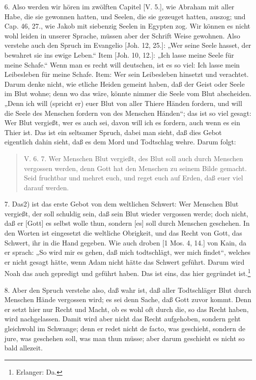 6. Also werden wir hören im zwölften Capitel [V. 5.], wie Abraham mit aller Habe, die sie gewonnen hatten, und Seelen, die sie gezeuget hatten, auszog; und Cap. 46, 27., wie Jakob mit siebenzig Seelen in Egypten zog. Wir können es nicht wohl leiden in unserer Sprache, müssen aber der Schrift Weise gewohnen. Also verstehe auch den Spruch im Evangelio [Joh. 12, 25.]: „Wer seine Seele hasset, der bewahret sie ins ewige Leben.“ Item [Joh. 10, 12.]: „Ich lasse meine Seele für meine Schafe.“ Wenn man es recht will deutschen, ist es so viel: Ich lasse mein Leibesleben für meine Schafe. Item: Wer sein Leibesleben hinsetzt und verachtet. Darum denke nicht, wie etliche Heiden gemeint haben, daß der Geist oder Seele im Blut wohne; denn wo das wäre, könnte nimmer die Seele vom Blut abscheiden. „Denn ich will (spricht er) euer Blut von aller Thiere Händen fordern, und will die Seele des Menschen fordern von des Menschen Händen“; das ist so viel gesagt: Wer Blut vergießt, wer es auch sei, davon will ich es fordern, auch wenn es ein Thier ist. Das ist ein seltsamer Spruch, dabei man sieht, daß dies Gebot eigentlich dahin sieht, daß es dem Mord und Todtschlag wehre. Darum folgt:

\begin{quote}
V. 6. 7. Wer Menschen Blut vergießt, des Blut soll auch durch Menschen vergossen werden, denn Gott hat den Menschen zu seinem Bilde gemacht. Seid fruchtbar und mehret euch, und reget euch auf Erden, daß euer viel darauf werden.
\end{quote}

7. Das2) ist das erste Gebot von dem weltlichen Schwert: Wer Menschen Blut vergießt, der soll schuldig sein, daß sein Blut wieder vergossen werde; doch nicht, daß er [Gott] es selbst wolle thun, sondern [es] soll durch Menschen geschehen. In den Worten ist eingesetzt die weltliche Obrigkeit, und das Recht von Gott, das Schwert, ihr in die Hand gegeben. Wie auch droben [1 Mos. 4, 14.] von Kain, da er sprach: „So wird mir es gehen, daß mich todtschlägt, wer mich findet“, welches er nicht gesagt hätte, wenn Adam nicht hätte das Schwert geführt. Darum wird Noah das auch gepredigt und geführt haben. Das ist eins, das hier gegründet ist.\footnote{Erlanger: Da.}

8. Aber den Spruch verstehe also, daß wahr ist, daß aller Todtschläger Blut durch Menschen Hände vergossen wird; es sei denn Sache, daß Gott zuvor kommt. Denn er setzt hier nur Recht und Macht, ob es wohl oft durch die, so das Recht haben, wird nachgelassen. Damit wird aber nicht das Recht aufgehoben, sondern geht gleichwohl im Schwange; denn er redet nicht de facto, was geschieht, sondern de jure, was geschehen soll, was man thun müsse; aber darum geschieht es nicht so bald allezeit.

